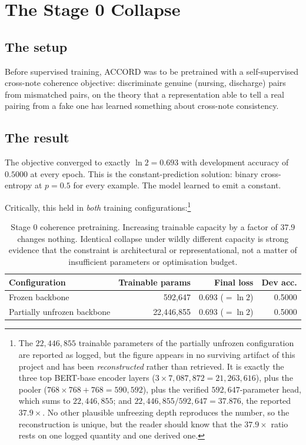 \section{The Stage 0 Collapse}
\label{sec:stage0}

\subsection{The setup}

Before supervised training, ACCORD was to be pretrained with a self-supervised
cross-note coherence objective: discriminate genuine (nursing, discharge) pairs
from mismatched pairs, on the theory that a representation able to tell a real
pairing from a fake one has learned something about cross-note consistency.

\subsection{The result}

The objective converged to exactly $\ln 2 = 0.693$ with development accuracy of
$0.5000$ at every epoch. This is the constant-prediction solution: binary
cross-entropy at $p = 0.5$ for every example. The model learned to emit a
constant.

Critically, this held in \emph{both} training configurations:\footnote{The
$22{,}446{,}855$ trainable parameters of the partially unfrozen configuration are
reported as logged, but the figure appears in no surviving artifact of this
project and has been \emph{reconstructed} rather than retrieved. It is exactly
the three top BERT-base encoder layers
($3 \times 7{,}087{,}872 = 21{,}263{,}616$), plus the pooler
($768 \times 768 + 768 = 590{,}592$), plus the verified $592{,}647$-parameter
head, which sums to $22{,}446{,}855$; and
$22{,}446{,}855 / 592{,}647 = 37.876$, the reported $37.9\times$. No other
plausible unfreezing depth reproduces the number, so the reconstruction is
unique, but the reader should know that the $37.9\times$ ratio rests on one
logged quantity and one derived one.}

\begin{table}[h]
\centering
\small
\begin{tabular}{lrrr}
\toprule
\textbf{Configuration} & \textbf{Trainable params} & \textbf{Final loss} & \textbf{Dev acc.} \\
\midrule
Frozen backbone             & 592,647    & 0.693 ($=\ln 2$) & 0.5000 \\
Partially unfrozen backbone & 22,446,855 & 0.693 ($=\ln 2$) & 0.5000 \\
\bottomrule
\end{tabular}
\caption{Stage 0 coherence pretraining. Increasing trainable capacity by a
factor of $37.9$ changes nothing. Identical collapse under wildly different
capacity is strong evidence that the constraint is architectural or
representational, not a matter of insufficient parameters or optimisation
budget.}
\label{tab:stage0}
\end{table}

